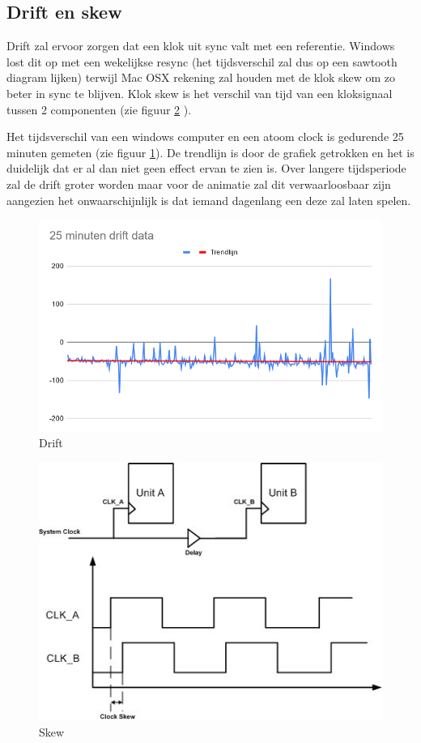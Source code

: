 \subsection{Drift en skew}

Drift zal ervoor zorgen dat een klok uit sync valt met een referentie. Windows lost dit op met een wekelijkse resync (het tijdsverschil zal dus op een sawtooth diagram lijken) terwijl Mac OSX rekening zal houden met de klok skew om zo beter in sync te blijven.
Klok skew is het verschil van tijd van een kloksignaal tussen 2 componenten (zie figuur \ref{skew1} \cite{skew}).

Het tijdsverschil van een windows computer en een atoom clock is gedurende 25 minuten gemeten (zie figuur \ref{drift}). De trendlijn is door de grafiek getrokken en het is duidelijk dat er al dan niet geen effect ervan te zien is. Over langere tijdsperiode zal de drift groter worden maar voor de animatie zal dit verwaarloosbaar zijn aangezien het onwaarschijnlijk is dat iemand dagenlang een deze zal laten spelen.

\begin{figure}[H]
\centering
\includegraphics[scale=0.3]{img/drift.png}
\caption{Drift} \label{drift}
\end{figure}

\begin{figure}[H]
\centering
\includegraphics[scale=0.7]{img/skew.jpg}
\caption{Skew} \label{skew1}
\end{figure}


